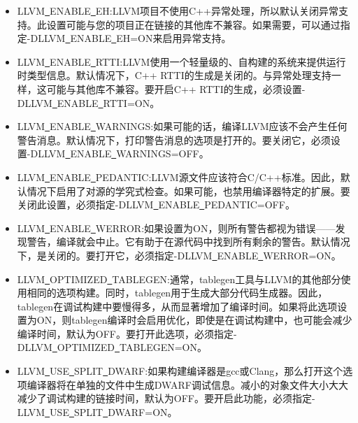 \begin{itemize}
\item LLVM\underline{~}ENABLE\underline{~}EH:LLVM项目不使用C++异常处理，所以默认关闭异常支持。此设置可能与您的项目正在链接的其他库不兼容。如果需要，可以通过指定-DLLVM\underline{~}ENABLE\underline{~}EH=ON来启用异常支持。
	
\item LLVM\underline{~}ENABLE\underline{~}RTTI:LLVM使用一个轻量级的、自构建的系统来提供运行时类型信息。默认情况下，C++ RTTI的生成是关闭的。与异常处理支持一样，这可能与其他库不兼容。要开启C++ RTTI的生成，必须设置-DLLVM\underline{~}ENABLE\underline{~}RTTI=ON。
	
\item LLVM\underline{~}ENABLE\underline{~}WARNINGS:如果可能的话，编译LLVM应该不会产生任何警告消息。默认情况下，打印警告消息的选项是打开的。要关闭它，必须设置-DLLVM\underline{~}ENABLE\underline{~}WARNINGS\allowbreak =OFF。
	
\item LLVM\underline{~}ENABLE\underline{~}PEDANTIC:LLVM源文件应该符合C/C++标准。因此，默认情况下启用了对源的学究式检查。如果可能，也禁用编译器特定的扩展。要关闭此设置，必须指定-DLLVM\underline{~}\allowbreak ENABLE\underline{~}PEDANTIC=OFF。
	
\item LLVM\underline{~}ENABLE\underline{~}WERROR:如果设置为ON，则所有警告都视为错误——发现警告，编译就会中止。它有助于在源代码中找到所有剩余的警告。默认情况下，是关闭的。要打开它，必须指定-DLLVM\underline{~}ENABLE\underline{~}WERROR=ON。
	
\item LLVM\underline{~}OPTIMIZED\underline{~}TABLEGEN:通常，tablegen工具与LLVM的其他部分使用相同的选项构建。同时，tablegen用于生成大部分代码生成器。因此，tablegen在调试构建中要慢得多，从而显著增加了编译时间。如果将此选项设置为ON，则tablegen编译时会启用优化，即使是在调试构建中，也可能会减少编译时间，默认为OFF。要打开此选项，必须指定-DLLVM\underline{~}OPTIMIZED\underline{~}TABLEGEN=ON。
	
\item LLVM\underline{~}USE\underline{~}SPLIT\underline{~}DWARF:如果构建编译器是gcc或Clang，那么打开这个选项编译器将在单独的文件中生成DWARF调试信息。减小的对象文件大小大大减少了调试构建的链接时间，默认为OFF。要开启此功能，必须指定-LLVM\underline{~}USE\underline{~}SPLIT\underline{~}DWARF=ON。

\end{itemize}


